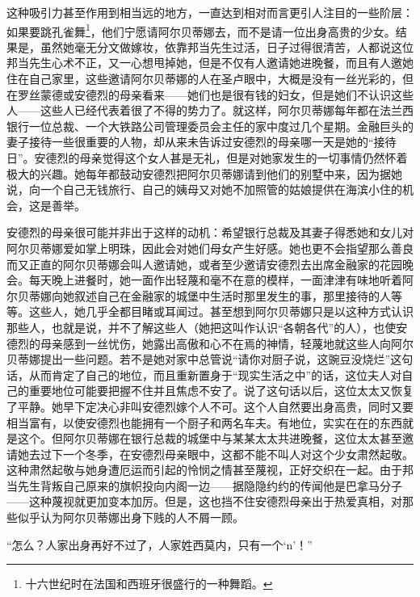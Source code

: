 \par 这种吸引力甚至作用到相当远的地方，一直达到相对而言更引人注目的一些阶层：如果要跳孔雀舞\footnote{十六世纪时在法国和西班牙很盛行的一种舞蹈。}，他们宁愿请阿尔贝蒂娜去，而不是请一位出身高贵的少女。结果是，虽然她毫无分文做嫁妆，依靠邦当先生过活，日子过得很清苦，人都说这位邦当先生心术不正，又一心想甩掉她，但是不仅有人邀请她进晚餐，而且有人邀她住在自己家里，这些邀请阿尔贝蒂娜的人在圣卢眼中，大概是没有一丝光彩的，但在罗丝蒙德或安德烈的母亲看来——她们也是很有钱的妇女，但是她们不认识这些人——这些人已经代表着很了不得的势力了。就这样，阿尔贝蒂娜每年都在法兰西银行一位总裁、一个大铁路公司管理委员会主任的家中度过几个星期。金融巨头的妻子接待一些很重要的人物，却从来未告诉过安德烈的母亲哪一天是她的“接待日”。安德烈的母亲觉得这个女人甚是无礼，但是对她家发生的一切事情仍然怀着极大的兴趣。她每年都鼓动安德烈把阿尔贝蒂娜请到他们的别墅中来，因为据她说，向一个自己无钱旅行、自己的姨母又对她不加照管的姑娘提供在海滨小住的机会，这是善举。
\par 安德烈的母亲很可能并非出于这样的动机：希望银行总裁及其妻子得悉她和女儿对阿尔贝蒂娜爱如掌上明珠，因此会对她们母女产生好感。她也更不会指望那么善良而又正直的阿尔贝蒂娜会叫人邀请她，或者至少邀请安德烈去出席金融家的花园晚会。每天晚上进餐时，她一面作出轻蔑和毫不在意的模样，一面津津有味地听着阿尔贝蒂娜向她叙述自己在金融家的城堡中生活时那里发生的事，那里接待的人等等。这些人，她几乎全都目睹或耳闻过。甚至想到阿尔贝蒂娜只是以这种方式认识那些人，也就是说，并不了解这些人（她把这叫作认识“各朝各代”的人），也使安德烈的母亲感到一丝忧伤，她露出高傲和心不在焉的神情，轻蔑地就这些人向阿尔贝蒂娜提出一些问题。若不是她对家中总管说“请你对厨子说，这豌豆没烧烂”这句话，从而肯定了自己的地位，而且重新置身于“现实生活之中”的话，这位夫人对自己的重要地位可能要把握不住并且焦虑不安了。说了这句话以后，这位太太又恢复了平静。她早下定决心非叫安德烈嫁个人不可。这个人自然要出身高贵，同时又要相当富有，以使安德烈也能拥有一个厨子和两名车夫。有地位，实实在在的东西就是这个。但阿尔贝蒂娜在银行总裁的城堡中与某某太太共进晚餐，这位太太甚至邀请她去过下一个冬季，在安德烈母亲眼中，这都不能不叫人对这个少女肃然起敬。这种肃然起敬与她身遭厄运而引起的怜悯之情甚至蔑视，正好交织在一起。由于邦当先生背叛自己原来的旗帜投向内阁一边——据隐隐约约的传闻他是巴拿马分子——这种蔑视就更加变本加厉。但是，这也挡不住安德烈母亲出于热爱真相，对那些似乎认为阿尔贝蒂娜出身下贱的人不屑一顾。
\par “怎么？人家出身再好不过了，人家姓西莫内，只有一个‘n’！”
